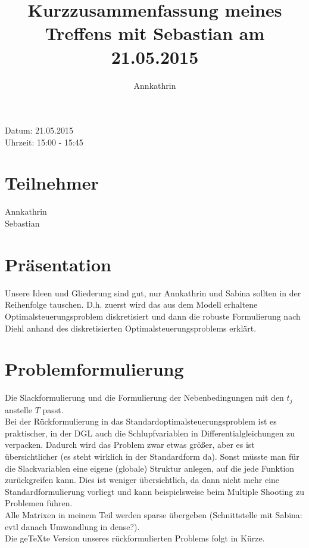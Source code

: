 \documentclass[12pt,a4paper]{article}
\theoremstyle{definition}
\theoremstyle{plain}
\begin{document}
	
\title{Kurzzusammenfassung meines Treffens mit Sebastian am 21.05.2015}
\author{Annkathrin}

\maketitle

Datum: 21.05.2015\\
Uhrzeit: 15:00 - 15:45

\tableofcontents

\section{Teilnehmer}
Annkathrin\\
Sebastian

\section{Präsentation}
Unsere Ideen und Gliederung sind gut, nur Annkathrin und Sabina sollten in der Reihenfolge tauschen. D.h. zuerst wird das aus dem Modell erhaltene Optimalsteuerungsproblem diskretisiert und dann die robuste Formulierung nach Diehl anhand des diskretisierten Optimalsteuerungsproblems erklärt.

\section{Problemformulierung} 
Die Slackformulierung und die Formulierung der Nebenbedingungen mit den $t_{j}$ anstelle $T$ passt.\\
Bei der Rückformulierung in das Standardoptimalsteuerungsproblem ist es praktischer, in der DGL auch die Schlupfvariablen in Differentialgleichungen zu verpacken. Dadurch wird das Problem zwar etwas größer, aber es ist übersichtlicher (es steht wirklich in der Standardform da). Sonst müsste man für die Slackvariablen eine eigene (globale) Struktur anlegen, auf die jede Funktion zurückgreifen kann. Dies ist weniger übersichtlich, da dann nicht mehr eine Standardformulierung vorliegt und kann beispielsweise beim Multiple Shooting zu Problemen führen.\\
Alle Matrixen in meinem Teil werden sparse übergeben (Schnittstelle mit Sabina: evtl danach Umwandlung in dense?).\\
Die geTeXte Version unseres rückformulierten Problems folgt in Kürze.
\end{document}
